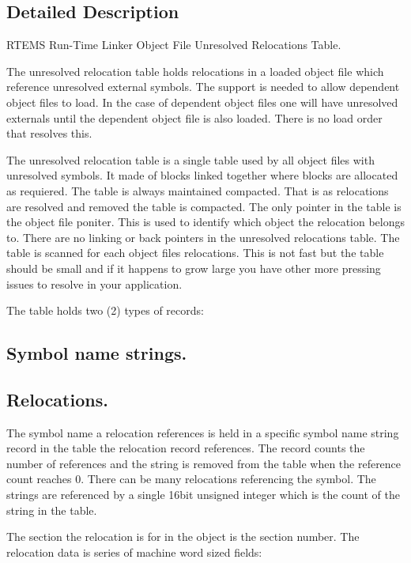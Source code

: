 \subsection{Detailed Description}
R\+T\+E\+MS Run-\/\+Time Linker Object File Unresolved Relocations Table. 

The unresolved relocation table holds relocations in a loaded object file which reference unresolved external symbols. The support is needed to allow dependent object files to load. In the case of dependent object files one will have unresolved externals until the dependent object file is also loaded. There is no load order that resolves this.

The unresolved relocation table is a single table used by all object files with unresolved symbols. It made of blocks linked together where blocks are allocated as requiered. The table is always maintained compacted. That is as relocations are resolved and removed the table is compacted. The only pointer in the table is the object file poniter. This is used to identify which object the relocation belongs to. There are no linking or back pointers in the unresolved relocations table. The table is scanned for each object file\textquotesingle{}s relocations. This is not fast but the table should be small and if it happens to grow large you have other more pressing issues to resolve in your application.

The table holds two (2) types of records\+:

\subsection*{Symbol name strings.}

\subsection*{Relocations.}

The symbol name a relocation references is held in a specific symbol name string record in the table the relocation record references. The record counts the number of references and the string is removed from the table when the reference count reaches 0. There can be many relocations referencing the symbol. The strings are referenced by a single 16bit unsigned integer which is the count of the string in the table.

The section the relocation is for in the object is the section number. The relocation data is series of machine word sized fields\+:

